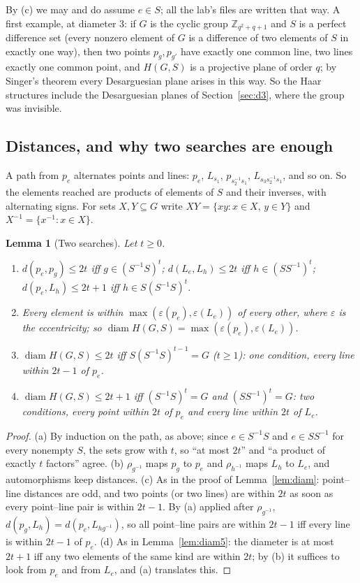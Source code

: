 \documentclass[11pt]{amsart}
\newtheorem{lemma}[theorem]{Lemma}
\theoremstyle{definition}
\theoremstyle{remark}
\newcommand{\diam}{\operatorname{diam}}
\begin{document}
By (c) we may and do assume $e\in S$; all the lab's files are written that way. A first example, at diameter $3$: if $G$ is the cyclic group $\mathbb{Z}_{q^2+q+1}$ and $S$ is a perfect difference set (every nonzero element of $G$ is a difference of two elements of $S$ in exactly one way), then two points $p_g,p_{g'}$ have exactly one common line, two lines exactly one common point, and $H(G,S)$ is a projective plane of order $q$; by Singer's theorem \cite{Si38} every Desarguesian plane arises in this way. So the Haar structures include the Desarguesian planes of Section~\ref{sec:d3}, where the group was invisible.

\subsection{Distances, and why two searches are enough}\label{ssec:twobfs}

A path from $p_e$ alternates points and lines: $p_e$, $L_{s_1}$, $p_{s_2^{-1}s_1}$, $L_{s_3s_2^{-1}s_1}$, and so on. So the elements reached are products of elements of $S$ and their inverses, with alternating signs. For sets $X,Y\subseteq G$ write $XY=\{xy:x\in X,\,y\in Y\}$ and $X^{-1}=\{x^{-1}:x\in X\}$.

\begin{lemma}[Two searches]\label{lem:twobfs}
Let $t\ge0$.
\begin{enumerate}[label=\textup{(\alph*)}]
\item $d(p_e,p_g)\le 2t$ iff $g\in(S^{-1}S)^t$; $d(L_e,L_h)\le 2t$ iff $h\in(SS^{-1})^t$; $d(p_e,L_h)\le 2t+1$ iff $h\in S(S^{-1}S)^t$.
\item Every element is within $\max(\varepsilon(p_e),\varepsilon(L_e))$ of every other, where $\varepsilon$ is the eccentricity; so $\diam H(G,S)=\max(\varepsilon(p_e),\varepsilon(L_e))$.
\item $\diam H(G,S)\le 2t$ iff $S(S^{-1}S)^{t-1}=G$ ($t\ge1$): one condition, every line within $2t-1$ of $p_e$.
\item $\diam H(G,S)\le 2t+1$ iff $(S^{-1}S)^t=G$ and $(SS^{-1})^t=G$: two conditions, every point within $2t$ of $p_e$ and every line within $2t$ of $L_e$.
\end{enumerate}
\end{lemma}

\begin{proof}
(a) By induction on the path, as above; since $e\in S^{-1}S$ and $e\in SS^{-1}$ for every nonempty $S$, the sets grow with $t$, so ``at most $2t$'' and ``a product of exactly $t$ factors'' agree. (b) $\rho_{g^{-1}}$ maps $p_g$ to $p_e$ and $\rho_{h^{-1}}$ maps $L_h$ to $L_e$, and automorphisms keep distances. (c) As in the proof of Lemma~\ref{lem:diam}: point--line distances are odd, and two points (or two lines) are within $2t$ as soon as every point--line pair is within $2t-1$. By (a) applied after $\rho_{g^{-1}}$, $d(p_g,L_h)=d(p_e,L_{hg^{-1}})$, so all point--line pairs are within $2t-1$ iff every line is within $2t-1$ of $p_e$. (d) As in Lemma~\ref{lem:diam5}: the diameter is at most $2t+1$ iff any two elements of the same kind are within $2t$; by (b) it suffices to look from $p_e$ and from $L_e$, and (a) translates this.
\end{proof}
\end{document}

